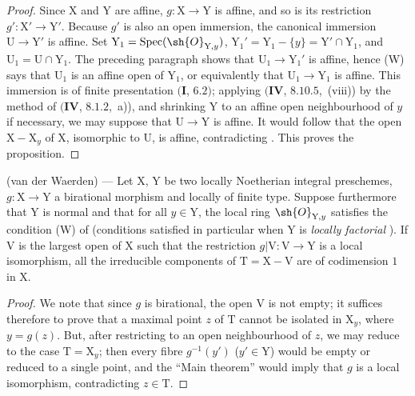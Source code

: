 \begin{proof}
Since $\mathrm{X}$ and $\mathrm{Y}$ are affine, $g:\mathrm{X}\to\mathrm{Y}$ is affine, and so is its restriction $g':\mathrm{X}'\to\mathrm{Y}'$.  Because $g'$ is also an open immersion, the canonical immersion $\mathrm{U}\to\mathrm{Y}'$ is affine.
Set $\mathrm{Y}_1=\operatorname{Spec}(\sh{O}_{\mathrm{Y},y})$, $\mathrm{Y}_1'=\mathrm{Y}_1-\{y\}=\mathrm{Y}'\cap\mathrm{Y}_1$, and $\mathrm{U}_1=\mathrm{U}\cap\mathrm{Y}_1$.  The preceding paragraph shows that $\mathrm{U}_1\to\mathrm{Y}_1'$ is affine, hence (W) says that $\mathrm{U}_1$ is an affine open of $\mathrm{Y}_1$, or equivalently that $\mathrm{U}_1\to\mathrm{Y}_1$ is affine.
This immersion is of finite presentation $(\mathbf{I}$, $6.2)$; applying $(\mathbf{IV}$, $8.10.5$,~(viii)) by the method of $(\mathbf{IV}$, $8.1.2$,~a)), and shrinking $\mathrm{Y}$ to an affine open neighbourhood of $y$ if necessary, we may suppose that $\mathrm{U}\to\mathrm{Y}$ is affine.  It would follow that the open $\mathrm{X}-\mathrm{X}_y$ of $\mathrm{X}$, isomorphic to $\mathrm{U}$, is affine, contradicting .  This proves the proposition.
\end{proof}

\begin{theorem}[21.12.12]
\label{IV.21.12.12}
\textup{(van der Waerden)} ---
Let $\mathrm{X}$, $\mathrm{Y}$ be two locally Noetherian integral preschemes, $g:\mathrm{X}\to\mathrm{Y}$ a birational morphism and locally of finite type.
Suppose furthermore that $\mathrm{Y}$ is normal and that for all $y\in\mathrm{Y}$, the local ring $\sh{O}_{\mathrm{Y},y}$ satisfies the condition \textup{(W)} of  (conditions satisfied in particular when $\mathrm{Y}$ is \emph{locally factorial} ).
If $\mathrm{V}$ is the largest open of $\mathrm{X}$ such that the restriction $g|\mathrm{V}:\mathrm{V}\to\mathrm{Y}$ is a local isomorphism, all the irreducible components of $\mathrm{T}=\mathrm{X}-\mathrm{V}$ are of codimension $1$ in $\mathrm{X}$.
\end{theorem}

\begin{proof}
We note that since $g$ is birational, the open $\mathrm{V}$ is not empty; it suffices therefore to prove that a maximal point $z$ of $\mathrm{T}$ cannot be isolated in $\mathrm{X}_y$, where $y=g(z)$.
But, after restricting to an open neighbourhood of $z$, we may reduce to the case $\mathrm{T}=\mathrm{X}_y$; then every fibre $g^{-1}(y')$ ($y'\in\mathrm{Y}$) would be empty or reduced to a single point, and the ``Main theorem''  would imply that $g$ is a local isomorphism, contradicting $z\in\mathrm{T}$.
\end{proof}

